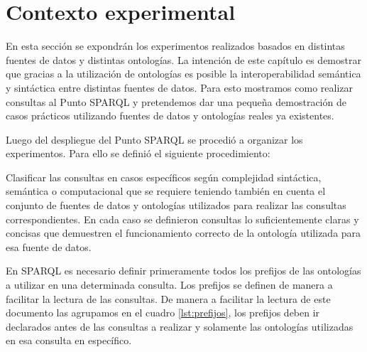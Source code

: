 \chapter{Contexto experimental}
\label{chap:Contexto experimental}


En esta sección se expondrán los experimentos realizados basados en distintas fuentes de datos y distintas ontologías. La intención de este capítulo es demostrar que gracias a la utilización de ontologías es posible la interoperabilidad semántica y sintáctica entre distintas fuentes de datos. Para esto mostramos como realizar consultas al Punto SPARQL y pretendemos dar una pequeña demostración de casos prácticos utilizando fuentes de datos y ontologías reales ya existentes. 

Luego del despliegue del Punto SPARQL se procedió a organizar los experimentos. Para ello se definió el siguiente procedimiento:

Clasificar las consultas en casos específicos según complejidad sintáctica, semántica o computacional que se requiere teniendo también en cuenta el conjunto de fuentes de datos y ontologías utilizados para realizar las consultas correspondientes.
En cada caso se definieron consultas lo suficientemente claras y concisas que demuestren el funcionamiento correcto de la ontología utilizada para esa fuente de datos.

En SPARQL es necesario definir primeramente todos los prefijos de las ontologías a utilizar en una determinada consulta. Los prefijos se definen de manera a facilitar la lectura de las consultas. De manera a facilitar la lectura de este documento las agrupamos en el cuadro \ref{lst:prefijos}, los prefijos deben ir declarados antes de las consultas a realizar y solamente las ontologías utilizadas en esa consulta en específico.




